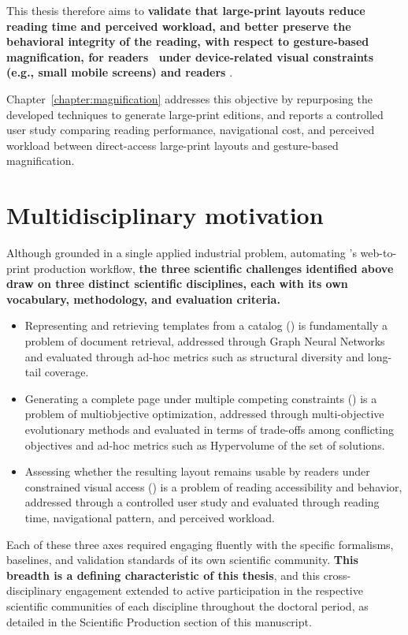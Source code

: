 This thesis therefore aims to \textbf{validate that large-print layouts reduce reading time and perceived workload, and better preserve the behavioral integrity of the reading, with respect to gesture-based magnification, for readers \NV\ under device-related visual constraints (e.g., small mobile screens) and readers \LV}. 

Chapter~\ref{chapter:magnification} addresses this objective by repurposing the developed techniques to generate large-print editions, and reports a controlled user study comparing reading performance, navigational cost, and perceived workload between direct-access large-print layouts and gesture-based magnification.

\section{Multidisciplinary motivation}
\label{sec:multidisciplinary-approach}

Although grounded in a single applied industrial problem, automating \melody's web-to-print production workflow, \textbf{the three scientific challenges identified above draw on three distinct scientific disciplines, each with its own vocabulary, methodology, and evaluation criteria.} 
\begin{itemize}
    \item Representing and retrieving templates from a catalog () is fundamentally a problem of document retrieval, addressed through Graph Neural Networks and evaluated through ad-hoc metrics such as structural diversity and long-tail coverage.
    \item Generating a complete page under multiple competing constraints () is a problem of multiobjective optimization, addressed through multi-objective evolutionary methods and evaluated in terms of trade-offs among conflicting objectives and ad-hoc metrics such as Hypervolume of the set of solutions.
    \item Assessing whether the resulting layout remains usable by readers under constrained visual access () is a problem of reading accessibility and behavior, addressed through a controlled user study and evaluated through reading time, navigational pattern, and perceived workload.
\end{itemize}
Each of these three axes required engaging fluently with the specific formalisms, baselines, and validation standards of its own scientific community. \textbf{This breadth is a defining characteristic of this thesis}, and this cross-disciplinary engagement extended to active participation in the respective scientific communities of each discipline throughout the doctoral period, as detailed in the Scientific Production section of this manuscript.

